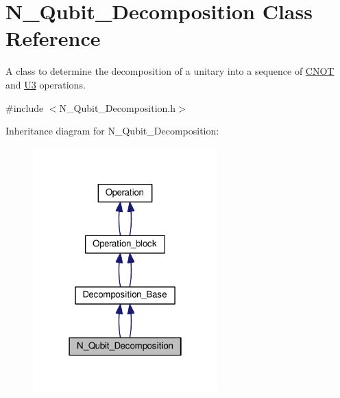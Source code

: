 \hypertarget{class_n___qubit___decomposition}{}\section{N\+\_\+\+Qubit\+\_\+\+Decomposition Class Reference}
\label{class_n___qubit___decomposition}


A class to determine the decomposition of a unitary into a sequence of \hyperlink{class_c_n_o_t}{C\+N\+OT} and \hyperlink{class_u3}{U3} operations.  




{\ttfamily \#include $<$N\+\_\+\+Qubit\+\_\+\+Decomposition.\+h$>$}



Inheritance diagram for N\+\_\+\+Qubit\+\_\+\+Decomposition\+:
\nopagebreak
\begin{figure}[H]
\begin{center}
\leavevmode
\includegraphics[width=202pt]{class_n___qubit___decomposition__inherit__graph}
\end{center}
\end{figure}
